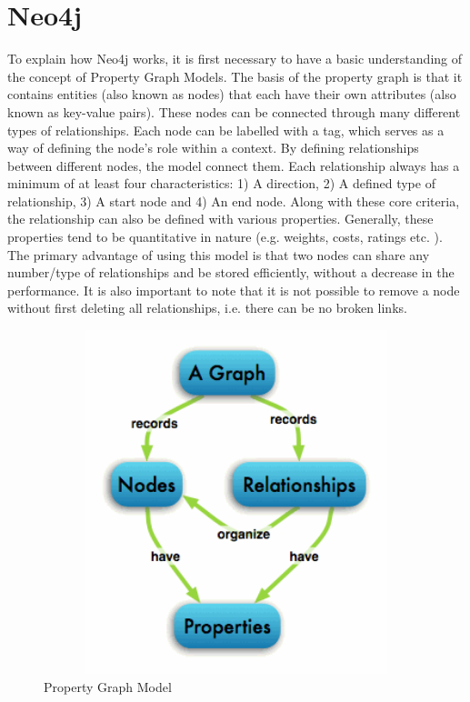 \section{Neo4j}
To explain how Neo4j works, it is first necessary to have a basic understanding of the concept of Property Graph Models. 
The basis of the property graph is that it contains entities (also known as nodes) that each have their own attributes (also known as key-value pairs). These nodes can be connected through many different types of relationships. Each node can be labelled with a tag, which serves as a way of defining the node’s role within a context.  By defining relationships between different nodes, the model connect them. Each relationship always has a minimum of at least four characteristics: 1) A direction, 2) A defined type of relationship, 3) A start node and 4) An end node. Along with these core criteria, the relationship can also be defined with various properties. Generally, these properties tend to be quantitative in nature (e.g. weights, costs, ratings etc. ). The primary advantage of using this model is that two nodes can share any number/type of relationships and be stored efficiently, without a decrease in the performance. It is also important to note that it is not possible to remove a node without first deleting all relationships, i.e. there can be no broken links. 

\begin{figure}[h]
	\caption{Property Graph Model}
	\centering
	\includegraphics[width=15cm, height=10cm]{img/graphdb-propmodel}
\end{figure}

